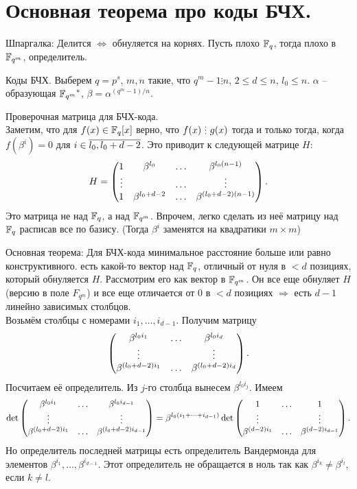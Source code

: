 \section{
 Основная теорема про коды БЧХ.
}

Шпаргалка: Делится $\Leftrightarrow$ обнуляется на корнях. Пусть плохо $\mathbb{F}_q$, тогда плохо в $\mathbb{F}_{q^m}$, определитель.


\dfn Коды БЧХ. Выберем $q = p^s$, $m, n$ такие, что $q^m-1 \vdots n$, $2 \le d \le n$, $l_0 \le n$. $\alpha$ -- образующая ${\mathbb{F}_{q^m}}^*$, $\beta=\alpha^{(q^m-1)/n}$.
\edfn


Проверочная матрица для БЧХ-кода.\\
Заметим, что для $f(x)\in \mathbb{F}_q[x]$ верно, что $f(x) \di g(x)$ тогда и только тогда, когда $f(\beta^i)=0$ для $i \in \overline{l_0,l_0+d-2}$. Это приводит к следующей матрице $H$:
$$H=\begin{pmatrix} 1& \beta^{l_0}& \dots& \beta^{l_0(n-1)}\\
\vdots &&\dots&\vdots\\
1& \beta^{l_0+d-2}& \dots & \beta^{(l_0+d-2)(n-1)}
\end{pmatrix}.$$
Это матрица не над $\mathbb{F}_q$, а над $\mathbb{F}_{q^m}$. Впрочем, легко сделать из неё матрицу над $\mathbb{F}_q$ расписав все по базису. (Тогда $\beta^i$ заменятся на квадратики $m \times m$)

\thrm Основная теорема: Для БЧХ-кода минимальное расстояние больше или равно конструктивного.
\ethrm
{} есть какой-то вектор над $\mathbb{F}_q$, отличный от нуля в $<d$ позициях, который обнуляется $H$. Рассмотрим его как вектор в $\mathbb{F}_{q^m}$. Он все еще обнуляет $H$ (версию в поле $F_{q^m}$) и все еще отличается от $0$ в $<d$ позициях $\Rightarrow$ есть $d-1$ линейно зависимых столбцов.\\
Возьмём столбцы с номерами $i_1,\dots,i_{d-1}$. Получим матрицу 
$$ \begin{pmatrix} 
\beta^{l_0 i_1}& \dots &\beta^{l_0 i_d}\\
\vdots & & \vdots\\
\beta^{(l_0+d-2)i_1} & \dots & \beta^{(l_0+d-2)i_d} 
\end{pmatrix}.$$
Посчитаем её определитель. Из $j$-го столбца вынесем $\beta^{l_0i_j}$. Имеем
$$ \det \begin{pmatrix} 
\beta^{l_0 i_1}& \dots &\beta^{l_0 i_{d-1}}\\
\vdots & & \vdots\\
\beta^{(l_0+d-2)i_1} & \dots & \beta^{(l_0+d-2)i_{d-1}} 
\end{pmatrix} = \beta^{l_0(i_1+\dots+i_{d-1})} \det  \begin{pmatrix} 
1& \dots &1\\
\vdots & & \vdots\\
\beta^{(d-2)i_1} & \dots & \beta^{(d-2)i_{d-1}} 
\end{pmatrix}.$$
Но определитель последней матрицы есть определитель Вандермонда для элементов $\beta^{i_1}, \dots, \beta^{i_{d-1}}$. Этот определитель не обращается в ноль так как $\beta^{i_k}\neq \beta^{i_l}$, если $k\neq l$.


\endproof
